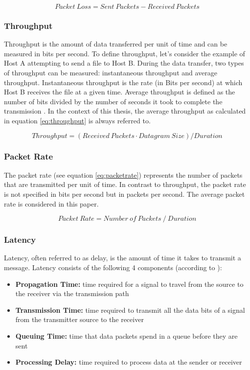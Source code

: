 \begin{equation}
Packet\ Loss = Sent\ Packets - Received\ Packets
\label{eq:packetloss}
\end{equation}

\subsubsection{Throughput}

Throughput is the amount of data transferred per unit of time and can be measured in bits per second. To define throughput, let's consider the example of Host A attempting to send a file to Host B. During the data transfer, two types of throughput can be measured: instantaneous throughput and average throughput. Instantaneous throughput is the rate (in Bits per second) at which Host B receives the file at a given time. Average throughput is defined as the number of bits divided by the number of seconds it took to complete the transmission \cite{datacalc01}. In the context of this thesis, the average throughput as calculated in equation \ref{eq:throughput} is always referred to.

\begin{equation}
Throughput = (Received\ Packets \cdot Datagram\ Size) / Duration
\label{eq:throughput}
\end{equation}

\subsubsection{Packet Rate}
The packet rate (see equation \ref{eq:packetrate}) represents the number of packets that are transmitted per unit of time. In contrast to throughput, the packet rate is not specified in bits per second but in packets per second. The average packet rate is considered in this paper.


\begin{equation}
Packet\ Rate = Number\ of\ Packets\ /\ Duration
\label{eq:packetrate}
\end{equation}

\subsubsection{Latency} \label{chap:LatencyExplanation}
Latency, often referred to as delay, is the amount of time it takes to transmit a message. Latency consists of the following 4 components (according to \cite{datacalc02}):

\begin{itemize}
	\item \textbf{Propagation Time:} time required for a signal to travel from the source to the receiver via the transmission path
	\item \textbf{Transmission Time:} time required to transmit all the data bits of a signal from the transmitter source to the receiver
	\item \textbf{Queuing Time:} time that data packets spend in a queue before they are sent
	\item \textbf{Processing Delay:} time required to process data at the sender or receiver
\end{itemize}

